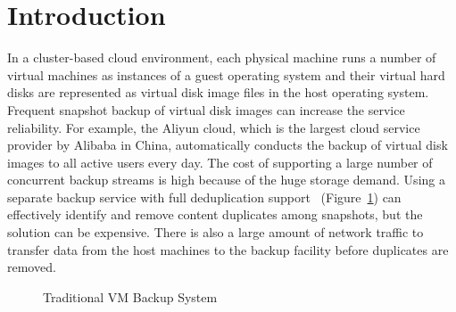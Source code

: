 \section{Introduction}
In a cluster-based cloud environment,
each physical machine runs a number  of virtual machines as  instances of a guest operating system 
and their  virtual hard disks are represented as virtual disk image files in the host operating system.
Frequent  snapshot backup of virtual disk images  can increase  the service reliability. 
For example, the Aliyun cloud, which is  the largest cloud service provider by Alibaba in China, 
automatically conducts  the backup of virtual disk images to all active users every day.
The cost of supporting a large number of concurrent backup streams is high
because of the huge storage demand. 
Using a separate  backup service with full deduplication support~\cite{venti02,bottleneck08}
(Figure~\ref{fig-traditional-arch})
can effectively identify and remove content duplicates among snapshots, 
but the solution can be expensive. There is also a large amount of 
network traffic to transfer  data from the host machines to the backup facility
before duplicates are removed.

\begin{figure}[htb]
    \label{fig-traditional-arch}
    \caption{Traditional VM Backup System}
\end{figure}


